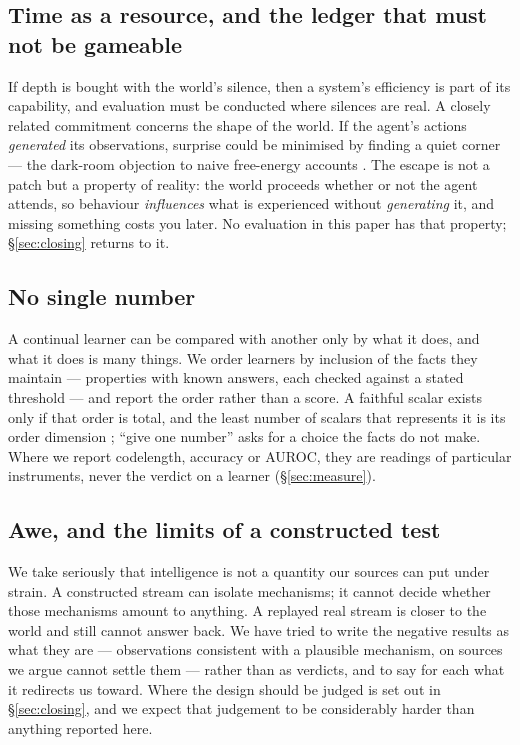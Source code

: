 \documentclass[11pt,a4paper]{article}
\theoremstyle{plain}
\theoremstyle{definition}
\theoremstyle{remark}
\begin{document}
\subsection{Time as a resource, and the ledger that must not be gameable}

If depth is bought with the world's silence, then a system's efficiency is part
of its capability, and evaluation must be conducted where silences are real. A
closely related commitment concerns the shape of the world. If the agent's
actions \emph{generated} its observations, surprise could be minimised by
finding a quiet corner --- the dark-room objection to naive free-energy accounts
\citep{friston2010free,friston2012free,clark2013whatever}. The escape is not a
patch but a property of reality: the world proceeds whether or not the agent
attends, so behaviour \emph{influences} what is experienced without
\emph{generating} it, and missing something costs you later. No evaluation in
this paper has that property; \S\ref{sec:closing} returns to it.

\subsection{No single number}

A continual learner can be compared with another only by what it does, and what
it does is many things. We order learners by inclusion of the facts they
maintain --- properties with known answers, each checked against a stated
threshold --- and report the order rather than a score. A faithful scalar exists
only if that order is total, and the least number of scalars that represents it
is its order dimension \citep{dushnik1941partially}; ``give one number'' asks
for a choice the facts do not make. Where we report codelength, accuracy or
AUROC, they are readings of particular instruments, never the verdict on a
learner (\S\ref{sec:measure}).

\subsection{Awe, and the limits of a constructed test}

We take seriously that intelligence is not a quantity our sources can put under
strain. A constructed stream can isolate mechanisms; it cannot decide whether
those mechanisms amount to anything. A replayed real stream is closer to the
world and still cannot answer back. We have tried to write the negative results
as what they are --- observations consistent with a plausible mechanism, on
sources we argue cannot settle them --- rather than as verdicts, and to say for
each what it redirects us toward. Where the design should be judged is set out
in \S\ref{sec:closing}, and we expect that judgement to be considerably harder
than anything reported here.
\end{document}
